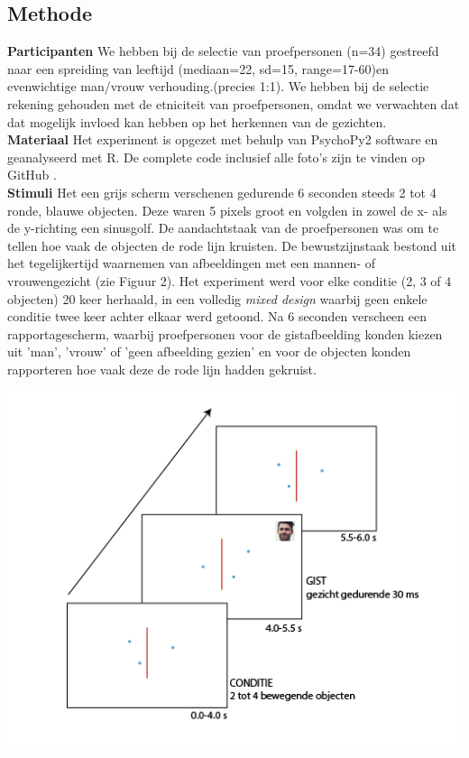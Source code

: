 \documentclass[a0,portrait]{a0poster}
\begin{document}
\begin{multicols}{3}
\section*{Methode}

\textbf{Participanten} We hebben bij de selectie van proefpersonen (n=34) gestreefd naar een spreiding van leeftijd (mediaan=22, sd=15, range=17-60)en evenwichtige man/vrouw verhouding.(precies 1:1). We hebben bij de selectie rekening gehouden met de etniciteit van proefpersonen, omdat we verwachten dat dat mogelijk invloed kan hebben op het herkennen van de gezichten\cite{sporer2001recognizing}. \\
\textbf{Materiaal} Het experiment is opgezet met behulp van PsychoPy2 software\cite{peirce2007psychopy, Peirce2009generating} en geanalyseerd met R\cite{Rsoftware}. De complete code inclusief alle foto's zijn te vinden op GitHub \cite{Grouls2017}.\\
\textbf{Stimuli} Het een grijs scherm verschenen gedurende 6 seconden steeds 2 tot 4 ronde, blauwe objecten. Deze waren 5 pixels groot en volgden in zowel de x- als de y-richting een sinusgolf. De aandachtstaak van de proefpersonen was om te tellen hoe vaak de objecten de rode lijn kruisten. De bewustzijnstaak bestond uit het tegelijkertijd waarnemen van afbeeldingen met een mannen- of vrouwengezicht (zie Figuur 2). Het experiment werd voor elke conditie (2, 3 of 4 objecten) 20 keer herhaald, in een volledig \textit{mixed design} waarbij geen enkele conditie twee keer achter elkaar werd getoond. Na 6 seconden verscheen een rapportagescherm, waarbij proefpersonen voor de gistafbeelding konden kiezen uit 'man', 'vrouw' of 'geen afbeelding gezien' en voor de objecten konden rapporteren hoe vaak deze de rode lijn hadden gekruist.
\begin{center}\vspace{1cm}
	\includegraphics[width=0.8\linewidth]{Methode.png}
\end{center}

\end{multicols}
\end{document}
